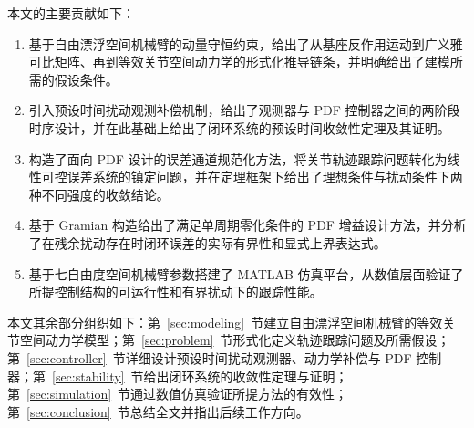 本文的主要贡献如下：
\begin{enumerate}
  \item 基于自由漂浮空间机械臂的动量守恒约束，给出了从基座反作用运动到广义雅可比矩阵、再到等效关节空间动力学的形式化推导链条，并明确给出了建模所需的假设条件。
  \item 引入预设时间扰动观测补偿机制，给出了观测器与 PDF 控制器之间的两阶段时序设计，并在此基础上给出了闭环系统的预设时间收敛性定理及其证明。
  \item 构造了面向 PDF 设计的误差通道规范化方法，将关节轨迹跟踪问题转化为线性可控误差系统的镇定问题，并在定理框架下给出了理想条件与扰动条件下两种不同强度的收敛结论。
  \item 基于 Gramian 构造给出了满足单周期零化条件的 PDF 增益设计方法，并分析了在残余扰动存在时闭环误差的实际有界性和显式上界表达式。
  \item 基于七自由度空间机械臂参数搭建了 MATLAB 仿真平台，从数值层面验证了所提控制结构的可运行性和有界扰动下的跟踪性能。
\end{enumerate}

本文其余部分组织如下：第~\ref{sec:modeling}~节建立自由漂浮空间机械臂的等效关节空间动力学模型；第~\ref{sec:problem}~节形式化定义轨迹跟踪问题及所需假设；第~\ref{sec:controller}~节详细设计预设时间扰动观测器、动力学补偿与 PDF 控制器；第~\ref{sec:stability}~节给出闭环系统的收敛性定理与证明；第~\ref{sec:simulation}~节通过数值仿真验证所提方法的有效性；第~\ref{sec:conclusion}~节总结全文并指出后续工作方向。